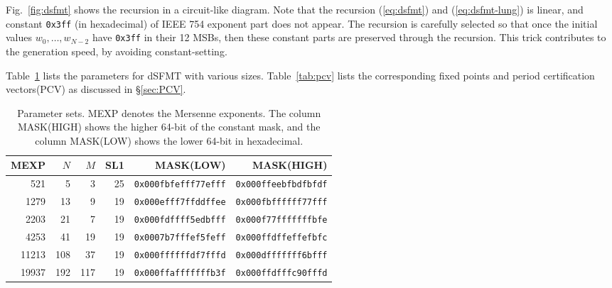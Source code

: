 \documentclass{svmult}
\begin{document}
Fig.~\ref{fig:dsfmt} shows the recursion in a circuit-like diagram.
Note that the recursion (\ref{eq:dsfmt}) and (\ref{eq:dsfmt-lung})
is linear, and constant \texttt{0x3ff} (in hexadecimal) of IEEE 754 exponent part
does not appear.
The recursion is carefully selected so that once
the initial values $w_0,\ldots , w_{N-2}$ have \texttt{0x3ff} in their 12 MSBs,
then these constant parts are preserved through the recursion. 
This trick contributes to the generation speed, by avoiding
constant-setting.

Table~\ref{tab:params} lists the parameters 
for dSFMT with various sizes.
Table~\ref{tab:pcv} lists the corresponding fixed points and period
certification vectors(PCV) as discussed in \S\ref{sec:PCV}.

\begin{table}
  \begin{center}
    \caption{Parameter sets. MEXP denotes the Mersenne exponents.
      The column MASK(HIGH) shows the higher
      64-bit of the constant mask, and the column MASK(LOW) shows
      the lower 64-bit in hexadecimal.}
    \label{tab:params}
    \begin{tabular}{rrrrrr} \hline
      MEXP & $N$ & $M$ & SL1 & MASK(LOW) & MASK(HIGH) \\ \hline \hline
      521 & 5 & 3 & 25 & \texttt{0x000fbfefff77efff} 
      & \texttt{0x000ffeebfbdfbfdf} \\
      1279 & 13 & 9 & 19 & \texttt{0x000efff7ffddffee} 
      & \texttt{0x000fbffffff77fff} \\
      2203 & 21 & 7 & 19 & \texttt{0x000fdffff5edbfff} 
      & \texttt{0x000f77fffffffbfe} \\
      4253 & 41 & 19 & 19 & \texttt{0x0007b7fffef5feff} 
      & \texttt{0x000ffdffeffefbfc} \\
      11213 & 108 & 37 & 19 & \texttt{0x000ffffffdf7fffd} 
      & \texttt{0x000dfffffff6bfff} \\
      19937 & 192 & 117 & 19 & \texttt{0x000ffafffffffb3f} 
      & \texttt{0x000ffdfffc90fffd} \\ \hline
    \end{tabular}
  \end{center}
\end{table}
\end{document}
